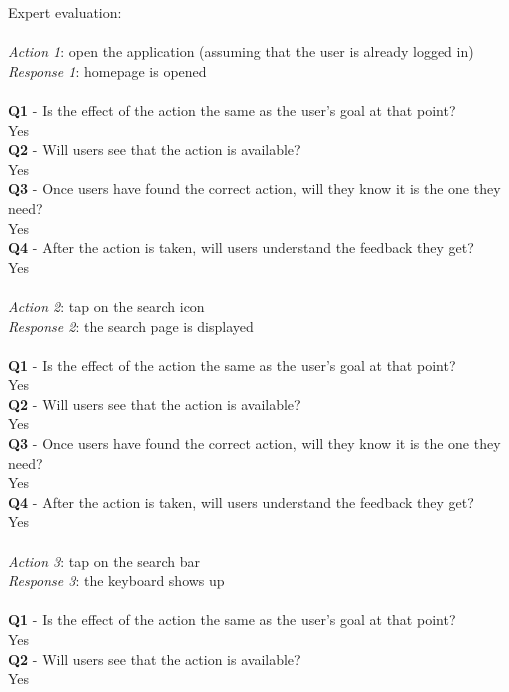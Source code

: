 \documentclass[12pt, a4paper]{article}
\numberwithin{figure}{section}
\newcommand\tab[1][1cm]{\hspace*{#1}}
\begin{document}
\noindent
Expert evaluation:\\\\
\textit{Action 1}: open the application (assuming that the user is already logged in)\\
\textit{Response 1}: homepage is opened\\\\
\textbf{Q1} - Is the effect of the action the same as the user’s goal at that point?\\
\tab Yes\\
\textbf{Q2} - Will users see that the action is available?\\
\tab Yes\\
\textbf{Q3} - Once users have found the correct action, will they know it is the one they need?\\
\tab Yes\\
\textbf{Q4} - After the action is taken, will users understand the feedback they get?\\
\tab Yes\\\\
\textit{Action 2}: tap on the search icon\\
\textit{Response 2}: the search page is displayed\\\\
\textbf{Q1} - Is the effect of the action the same as the user’s goal at that point?\\
\tab Yes\\
\textbf{Q2} - Will users see that the action is available?\\
\tab Yes\\
\textbf{Q3} - Once users have found the correct action, will they know it is the one they need?\\
\tab Yes\\
\textbf{Q4} - After the action is taken, will users understand the feedback they get?\\
\tab Yes\\\\
\textit{Action 3}: tap on the search bar\\
\textit{Response 3}: the keyboard shows up\\\\
\textbf{Q1} - Is the effect of the action the same as the user’s goal at that point?\\
\tab Yes\\
\textbf{Q2} - Will users see that the action is available?\\
\tab Yes\\
\end{document}
